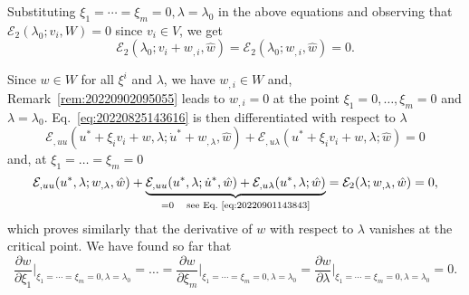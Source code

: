 \documentclass[12pt, final]{scrartcl}
\theoremstyle{definition}
\newcommand{\E}{\mathcal E}
\begin{document}
Substituting $\xi_1 = \cdots = \xi_m = 0, \lambda = \lambda_0$ in the above equations and
observing that $\E_2(\lambda_0; v_i, W) = 0$ since $v_i \in V$, we get
\begin{equation}
\label{eq:20220825150219}
  \E_2(\lambda_0; v_i + w_{,i}, \hat{w}) = \E_2(\lambda_0; w_{,i}, \hat{w}) = 0.
\end{equation}

Since $w \in W$ for all $\xi^i$ and $\lambda$, we have $w_{,i} \in W$ and,
Remark~\ref{rem:20220902095055} leads to $w_{,i} = 0$ at the point
$\xi_1 = 0, \ldots, \xi_m = 0$ and $\lambda = \lambda_0$. Eq.~\eqref{eq:20220825143616} is
then differentiated with respect to  $\lambda$
\begin{equation}
  \label{eq:20220830145945}
  \E_{,uu}(u^\ast + \xi_i v_i + w, \lambda; \dot{u}^\ast + w_{,\lambda}, \hat{w}) + \E_{,u\lambda}(u^\ast + \xi_i v_i + w, \lambda; \hat{w}) = 0
\end{equation}
and, at $\xi_1 = \ldots = \xi_m = 0$
\begin{equation}
  \label{eq:20220830151513}
  \E_{,uu}(u^\ast, \lambda; w_{,\lambda}, \hat{w})
  + \underbrace{\E_{,uu}(u^\ast, \lambda; \dot{u}^\ast, \hat{w}) + \E_{,u\lambda}(u^\ast, \lambda; \hat{w})}_{=0 \quad \text{see Eq.~\eqref{eq:20220901143843}}}
  = \E_2(\lambda; w_{,\lambda}, \hat{w}) = 0,
\end{equation}
which proves similarly that the derivative of $w$ with respect to $\lambda$
vanishes at the critical point. We have found so far that
\begin{equation}
  \frac{\partial w}{\partial\xi_1} \biggr\rvert_{\xi_1 = \cdots = \xi_m = 0, \lambda = \lambda_0}
  = \ldots =
  \frac{\partial w}{\partial\xi_m} \biggr\rvert_{\xi_1 = \cdots = \xi_m = 0, \lambda = \lambda_0}
  = \frac{\partial w}{\partial\lambda} \biggr\rvert_{\xi_1 = \cdots = \xi_m = 0, \lambda = \lambda_0}= 0.
\end{equation}
\end{document}
